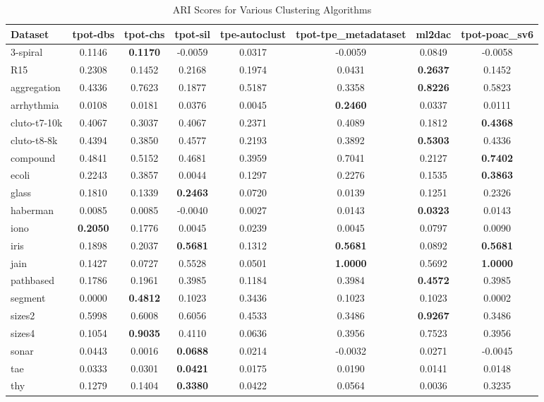 \begin{table}
\caption{ARI Scores for Various Clustering Algorithms}
\label{tab:ari_scores}
\begin{tabular}{lccccccc}
\toprule
Dataset & tpot-dbs & tpot-chs & tpot-sil & tpe-autoclust & tpot-tpe_metadataset & ml2dac & tpot-poac_sv6 \\
\midrule
3-spiral & 0.1146 & \textbf{0.1170} & -0.0059 & 0.0317 & -0.0059 & 0.0849 & -0.0058 \\
R15 & 0.2308 & 0.1452 & 0.2168 & 0.1974 & 0.0431 & \textbf{0.2637} & 0.1452 \\
aggregation & 0.4336 & 0.7623 & 0.1877 & 0.5187 & 0.3358 & \textbf{0.8226} & 0.5823 \\
arrhythmia & 0.0108 & 0.0181 & 0.0376 & 0.0045 & \textbf{0.2460} & 0.0337 & 0.0111 \\
cluto-t7-10k & 0.4067 & 0.3037 & 0.4067 & 0.2371 & 0.4089 & 0.1812 & \textbf{0.4368} \\
cluto-t8-8k & 0.4394 & 0.3850 & 0.4577 & 0.2193 & 0.3892 & \textbf{0.5303} & 0.4336 \\
compound & 0.4841 & 0.5152 & 0.4681 & 0.3959 & 0.7041 & 0.2127 & \textbf{0.7402} \\
ecoli & 0.2243 & 0.3857 & 0.0044 & 0.1297 & 0.2276 & 0.1535 & \textbf{0.3863} \\
glass & 0.1810 & 0.1339 & \textbf{0.2463} & 0.0720 & 0.0139 & 0.1251 & 0.2326 \\
haberman & 0.0085 & 0.0085 & -0.0040 & 0.0027 & 0.0143 & \textbf{0.0323} & 0.0143 \\
iono & \textbf{0.2050} & 0.1776 & 0.0045 & 0.0239 & 0.0045 & 0.0797 & 0.0090 \\
iris & 0.1898 & 0.2037 & \textbf{0.5681} & 0.1312 & \textbf{0.5681} & 0.0892 & \textbf{0.5681} \\
jain & 0.1427 & 0.0727 & 0.5528 & 0.0501 & \textbf{1.0000} & 0.5692 & \textbf{1.0000} \\
pathbased & 0.1786 & 0.1961 & 0.3985 & 0.1184 & 0.3984 & \textbf{0.4572} & 0.3985 \\
segment & 0.0000 & \textbf{0.4812} & 0.1023 & 0.3436 & 0.1023 & 0.1023 & 0.0002 \\
sizes2 & 0.5998 & 0.6008 & 0.6056 & 0.4533 & 0.3486 & \textbf{0.9267} & 0.3486 \\
sizes4 & 0.1054 & \textbf{0.9035} & 0.4110 & 0.0636 & 0.3956 & 0.7523 & 0.3956 \\
sonar & 0.0443 & 0.0016 & \textbf{0.0688} & 0.0214 & -0.0032 & 0.0271 & -0.0045 \\
tae & 0.0333 & 0.0301 & \textbf{0.0421} & 0.0175 & 0.0190 & 0.0141 & 0.0148 \\
thy & 0.1279 & 0.1404 & \textbf{0.3380} & 0.0422 & 0.0564 & 0.0036 & 0.3235 \\
\bottomrule
\end{tabular}
\end{table}
